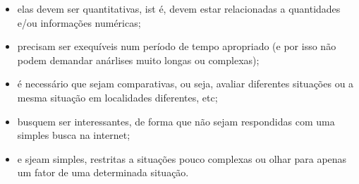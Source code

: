 \begin{itemize}
\item elas devem ser quantitativas, ist é, devem estar relacionadas a quantidades e/ou informações numéricas;
\item precisam ser exequíveis num período de tempo apropriado (e por isso não podem demandar anárlises muito longas ou complexas);
\item é necessário que sejam comparativas, ou seja, avaliar diferentes situações ou a mesma situação em localidades diferentes, etc;
\item busquem ser interessantes, de forma que não sejam respondidas com uma simples busca na internet;
\item e sjeam simples, restritas a situações pouco complexas ou olhar para apenas um fator de uma determinada situação.
\end{itemize}





